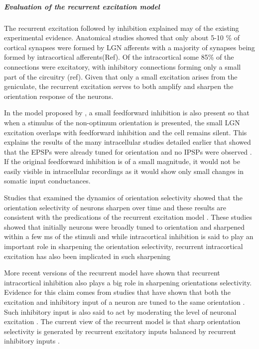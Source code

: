 \subparagraph{Evaluation of the recurrent excitation model}

The recurrent excitation followed by inhibition explained may of the existing experimental evidence. Anatomical studies showed that only about 5-10 \% of cortical synapses were formed by LGN afferents with a majority of synapses being formed by intracortical afferents(Ref). Of the intracortical some 85\% of the connections were excitatory, with inhibitory connections forming only a small part of the circuitry (ref). Given that only a small excitation arises from the geniculate, the recurrent excitation serves to both amplify and sharpen the orientation response of the neurons. 

In the model proposed by \cite{Douglas1995}, a small feedforward inhibition is also present so that when a stimulus of the non-optimum orientation is presented, the small LGN excitation overlaps with feedforward inhibition and the cell remains silent. This explains the results of the many intracellular studies detailed earlier that showed that the EPSPs were  already tuned for orientation and no IPSPs were observed \cite{Ferster1986, Anderson2000}. If the original feedforward inhibition is of a small magnitude, it would not be easily visible in intracellular recordings as it would show only small changes in somatic input conductances.

Studies that examined the dynamics of orientation selectivity showed that the orientation selectivity of neurons sharpen over time and these results are consistent with the predications of the recurrent excitation model \cite{Ringach2002c, Volgushev1995, Pei1994}. These studies showed that initially neurons were broadly tuned to orientation and sharpened within a few ms of the stimuli and while intracortical inhibition is said to play an important role in sharpening the orientation selectivity, recurrent intracortical excitation has also been implicated in such sharpening \cite{Ringach2002c, Vidyasagar1996b, Pei1994, Adorjan1999}

More recent versions of the recurrent model have shown that recurrent intracortical inhibition also plays a big role in sharpening orientations selectivity. Evidence for this claim comes from studies that have shown that both the excitation and inhibitory input of a neuron are tuned to the same orientation \cite{Anderson2000, Monier2003, Tan2011a}. Such inhibitory input is also said to act by moderating the level of neuronal excitation \cite{Nelson1998, Sato2016}. The current view of the recurrent model is that sharp orientation selectivity is generated by recurrent excitatory inputs balanced by recurrent inhibitory inputs \cite{Nelson1998, Shu2003}.


